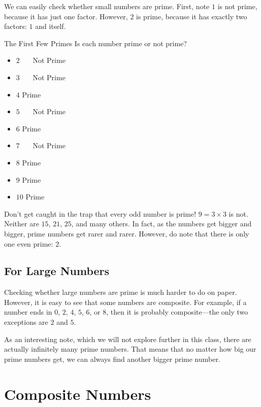 \documentclass[a4paper,10pt]{report}
\begin{document}
We can easily check whether small numbers are prime. First, note $1$ is not
prime, because it has just one factor. However, $2$ is prime, because it has
exactly two factors: $1$ and itself.

\begin{problem}{The First Few Primes}
 Is each number prime or not prime?

 \begin{itemize}
  \item $2$ \hfill {}~~~Not Prime
  \item $3$ \hfill {}~~~Not Prime
  \item $4$ \hfill Prime~~~
  \item $5$ \hfill {}~~~Not Prime
  \item $6$ \hfill Prime~~~
  \item $7$ \hfill {}~~~Not Prime
  \item $8$ \hfill Prime~~~
  \item $9$ \hfill Prime~~~
  \item $10$ \hfill Prime~~~
 \end{itemize}
\end{problem}

Don't get caught in the trap that every odd number is prime! $9=3\times3$ is
not. Neither are $15$, $21$, $25$, and many others. In fact, as the numbers get
bigger and bigger, prime numbers get rarer and rarer. However, do note that
there is only one even prime: $2$.

\subsection{For Large Numbers}

Checking whether large numbers are prime is much harder to do on paper. However,
it is easy to see that some numbers are composite. For example, if a number ends
in $0$, $2$, $4$, $5$, $6$, or $8$, then it is probably composite---the only two
exceptions are $2$ and $5$.

As an interesting note, which we will not explore further in this class, there
are actually infinitely many prime numbers. That means that no matter how big
our prime numbers get, we can always find another bigger prime number.

\section{Composite Numbers}
\end{document}
